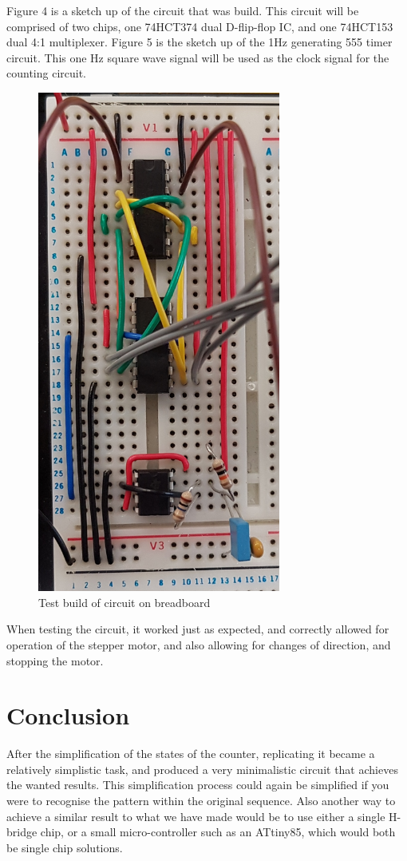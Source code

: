 \documentclass[a4paper,11pt]{article}
\begin{document}
Figure 4 is a sketch up of the circuit that was build. This circuit will be comprised of two chips, one 74HCT374 dual D-flip-flop IC, and one 74HCT153 dual 4:1 multiplexer. Figure 5 is the sketch up of the 1Hz generating 555 timer circuit. This one Hz square wave signal will be used as the clock signal for the counting circuit.
\newpage
\begin{figure}[h]
\centering
\includegraphics[width = 8cm]{20190410_152117(1).jpg}
\caption{Test build of circuit on breadboard}
\end{figure}
When testing the circuit, it worked just as expected, and correctly allowed for operation of the stepper motor, and also allowing for changes of direction, and stopping the motor.

\section*{Conclusion}
After the simplification of the states of the counter, replicating it became a relatively simplistic task, and produced a very minimalistic circuit that achieves the wanted results. This simplification process could again be simplified if you were to recognise the pattern within the original sequence. Also another way to achieve a similar result to what we have made would be to use either a single H-bridge chip, or a small micro-controller such as an ATtiny85, which would both be single chip solutions. 
\end{document}
